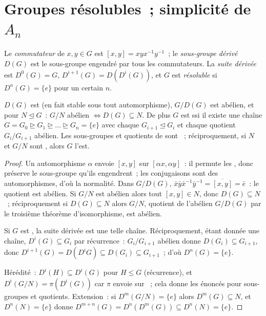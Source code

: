 \section{Groupes résolubles~; simplicité de \texorpdfstring{$A_n$}{An}}

\begin{definition}\label{def:b3:groups:derived}
Le \emph{commutateur} de $x, y \in G$ est
$[x,y] = xyx^{-1}y^{-1}$~; le \emph{sous-groupe
dérivé} $D(G)$ est le sous-groupe
engendré par tous les commutateurs. La \emph{suite dérivée} est
$D^0(G) = G$, $D^{i+1}(G) = D(D^i(G))$, et $G$ est
\emph{résoluble} si $D^n(G) = \{e\}$ pour
un certain $n$.
\end{definition}

\begin{proposition}\label{prop:b3:groups:derived}
$D(G)$ est  (en fait stable sous tout automorphisme),
$G/D(G)$ est abélien, et pour $N \trianglelefteq G$~: $G/N$ abélien
$\iff D(G) \subseteq N$. De plus $G$ est  ssi il existe
une chaîne $G = G_0 \trianglerighteq G_1 \trianglerighteq \dots
\trianglerighteq G_n = \{e\}$ avec chaque $G_{i+1}
\trianglelefteq G_i$ et chaque quotient $G_i/G_{i+1}$ abélien. Les
sous-groupes et quotients de  sont ~;
réciproquement, si $N$ et $G/N$ sont , alors $G$ l'est.
\end{proposition}

\begin{proof}
Un automorphisme $\alpha$ envoie $[x,y]$ sur $[\alpha x, \alpha
y]$~: il permute les , donc préserve le sous-groupe
qu'ils engendrent~; les conjugaisons sont des automorphismes,
d'où la normalité. Dans $G/D(G)$, $\bar x\bar y \bar x^{-1}\bar
y^{-1} = \overline{[x,y]} = \bar e$~: le quotient est abélien. Si
$G/N$ est abélien alors tout $[x,y] \in N$, donc $D(G) \subseteq
N$~; réciproquement si $D(G) \subseteq N$ alors $G/N$, quotient de
l'abélien $G/D(G)$ par le troisième théorème d'isomorphisme, est
abélien.

Si $G$ est , la suite dérivée est une telle chaîne.
Réciproquement, étant donnée une chaîne, $D^i(G) \subseteq G_i$
par récurrence~: $G_i/G_{i+1}$ abélien donne $D(G_i) \subseteq
G_{i+1}$, donc $D^{i+1}(G) = D(D^i G) \subseteq D(G_i) \subseteq
G_{i+1}$~; d'où $D^n(G) = \{e\}$.

Hérédité~: $D^i(H) \subseteq D^i(G)$ pour $H \leq G$
(récurrence), et $D^i(G/N) = \pi(D^i(G))$ car $\pi$ envoie
 sur ~; cela donne les énoncés pour
sous-groupes et quotients. Extension~: si $D^m(G/N) = \{e\}$
alors $D^m(G) \subseteq N$, et $D^n(N) = \{e\}$ donne
$D^{m+n}(G) = D^n(D^m(G)) \subseteq D^n(N) = \{e\}$.
\end{proof}

